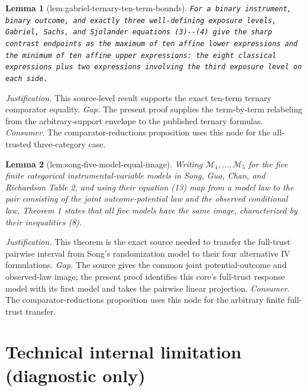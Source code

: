 \documentclass{article}
\newtheorem{lemma}{Lemma}
\begin{document}
\begin{lemma}[lem:gabriel-ternary-ten-term-bounds]\label{lem:gabriel-ternary-ten-term-bounds}
\texttt{For a binary instrument,\allowbreak{} binary outcome,\allowbreak{} and exactly three well-\allowbreak{}defining exposure levels,\allowbreak{} Gabriel,\allowbreak{} Sachs,\allowbreak{} and Sjolander equations (3)-\allowbreak{}-\allowbreak{}(4) give the sharp contrast endpoints as the maximum of ten affine lower expressions and the minimum of ten affine upper expressions:\allowbreak{} the eight classical expressions plus two expressions involving the third exposure level on each side.}
\end{lemma}
\par\smallskip\noindent \textit{Justification.} This source-level result supports the exact ten-term ternary comparator equality. \textit{Gap.} The present proof supplies the term-by-term relabeling from the arbitrary-support envelope to the published ternary formulas. \textit{Consumer.} The comparator-reductions proposition uses this node for the all-trusted three-category case.

\begin{lemma}[lem:song-five-model-equal-image]\label{lem:song-five-model-equal-image}
Writing \(\mathcal M_1,\ldots,\mathcal M_5\) for the five finite categorical instrumental-variable models in Song, Guo, Chan, and Richardson Table 2, and using their equation (13) map from a model law to the pair consisting of the joint outcome-potential law and the observed conditional law, Theorem 1 states that all five models have the same image, characterized by their inequalities (8).
\end{lemma}
\par\smallskip\noindent \textit{Justification.} This theorem is the exact source needed to transfer the full-trust pairwise interval from Song's randomization model to their four alternative IV formulations. \textit{Gap.} The source gives the common joint potential-outcome and observed-law image; the present proof identifies this core's full-trust response model with its first model and takes the pairwise linear projection. \textit{Consumer.} The comparator-reductions proposition uses this node for the arbitrary finite full-trust transfer.

\section*{Technical internal limitation (diagnostic only)}
\end{document}
